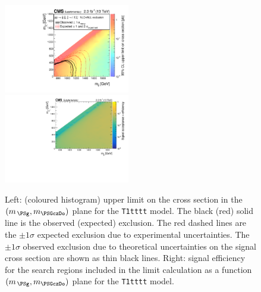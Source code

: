\clearpage
\begin{figure}[!h]
  \begin{center}
    \includegraphics[width=0.49\textwidth]{Supplementary/RA1T1ttttXSEC_aux} \, 
    \includegraphics[width=0.49\textwidth]{Supplementary/T1tttt_merging_4_cats_aux} \,     
  \end{center}
  \caption{Left: (coloured histogram) upper limit on the cross section in the $(m_{\,\PSg}, m_{\PSGczDo})$ plane for the \texttt{T1tttt} model. 
  The black (red) solid line is the observed (expected) exclusion. The red dashed lines are the $\pm1\sigma$ expected exclusion due to experimental uncertainties. 
  The $\pm1\sigma$ observed exclusion due to theoretical uncertainties on the signal cross section are shown as thin black lines. 
  Right: signal efficiency for the search regions included in the limit calculation as a function $(m_{\,\PSg}, m_{\PSGczDo})$ plane for the \texttt{T1tttt} model. 
  \label{fig:T1tttt_excl}}
\end{figure}

